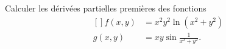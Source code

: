 
\begin{exercice}\label{exoOutilsMath-0054}

    Calculer les dérivées partielles premières des fonctions
    \begin{equation}
        \begin{aligned}[]
            f(x,y)&=x^2y^2\ln(x^2+y^2)\\
            g(x,y)&=xy\sin\frac{1}{ x^2+y^2 }.
        \end{aligned}
    \end{equation}

\end{exercice}
